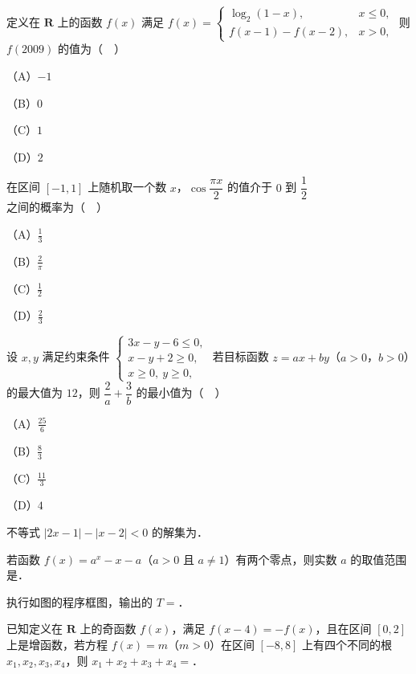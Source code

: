 \begin{question}
定义在 $\mathbf R$ 上的函数 $f(x)$ 满足 $f(x)=\begin{cases}\log_2(1-x),&x\leqslant0,\\ f(x-1)-f(x-2),&x>0,\end{cases}$ 则 $f(2009)$ 的值为（　）

（A）$-1$

（B）$0$

（C）$1$

（D）$2$

\end{question}
\begin{question}
在区间 $[-1,1]$ 上随机取一个数 $x$，$\cos\dfrac{\pi x}{2}$ 的值介于 $0$ 到 $\dfrac12$ 之间的概率为（　）

（A）$\frac13$

（B）$\frac2\pi$

（C）$\frac12$

（D）$\frac23$

\end{question}
\begin{question}
设 $x,y$ 满足约束条件 $\begin{cases}3x-y-6\leqslant0,\\ x-y+2\geqslant0,\\ x\geqslant0,\ y\geqslant0,\end{cases}$ 若目标函数 $z=ax+by$（$a>0$，$b>0$）的最大值为 $12$，则 $\dfrac2a+\dfrac3b$ 的最小值为（　）

（A）$\frac{25}{6}$

（B）$\frac83$

（C）$\frac{11}3$

（D）$4$

\end{question}

\begin{question}
不等式 $|2x-1|-|x-2|<0$ 的解集为\gkblank{}．

\end{question}
\begin{question}
若函数 $f(x)=a^x-x-a$（$a>0$ 且 $a\neq1$）有两个零点，则实数 $a$ 的取值范围是\gkblank{}．

\Needspace{0.4\textheight}
\end{question}
\begin{question}
执行如图的程序框图，输出的 $T=$\gkblank{}．
\nopagebreak[4]
\begin{center}\end{center}
\nopagebreak[4]
\end{question}
\begin{question}
已知定义在 $\mathbf R$ 上的奇函数 $f(x)$，满足 $f(x-4)=-f(x)$，且在区间 $[0,2]$ 上是增函数，若方程 $f(x)=m$（$m>0$）在区间 $[-8,8]$ 上有四个不同的根 $x_1,x_2,x_3,x_4$，则 $x_1+x_2+x_3+x_4=$\gkblank{}．

\end{question}

